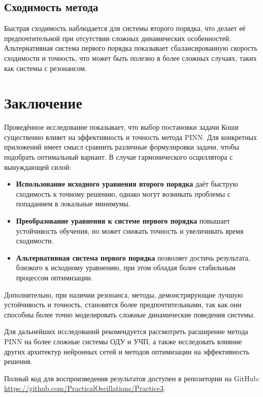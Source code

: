 \documentclass[12pt,a4paper]{article}
\begin{document}
\subsection{Сходимость метода}
Быстрая сходимость наблюдается для системы второго порядка, что делает её предпочтительной при отсутствии сложных динамических особенностей. Альтернативная система первого порядка показывает сбалансированную скорость сходимости и точность, что может быть полезно в более сложных случаях, таких как системы с резонансом.
\section{Заключение}

Проведённое исследование показывает, что выбор постановки задачи Коши существенно влияет на эффективность и точность метода PINN. Для конкретных приложений имеет смысл сравнить различные формулировки задачи, чтобы подобрать оптимальный вариант. В случае гармонического осциллятора с вынуждающей силой:

\begin{itemize}
    \item \textbf{Использование исходного уравнения второго порядка} даёт быструю сходимость к точному решению, однако могут возникать проблемы с попаданием в локальные минимумы.
    \item \textbf{Преобразование уравнения к системе первого порядка} повышает устойчивость обучения, но может снижать точность и увеличивать время сходимости.
    \item \textbf{Альтернативная система первого порядка} позволяет достичь результата, близкого к исходному уравнению, при этом обладая более стабильным процессом оптимизации.
\end{itemize}

Дополнительно, при наличии резонанса, методы, демонстрирующие лучшую устойчивость и точность, становятся более предпочтительными, так как они способны более точно моделировать сложные динамические поведения системы.

Для дальнейших исследований рекомендуется рассмотреть расширение метода PINN на более сложные системы ОДУ и УЧП, а также исследовать влияние других архитектур нейронных сетей и методов оптимизации на эффективность решения.

Полный код для воспроизведения результатов доступен в репозитории на GitHub:\\
\href{https://github.com/PracticalOscillations/Practice3}{https://github.com/PracticalOscillations/Practice3}.
\end{document}
